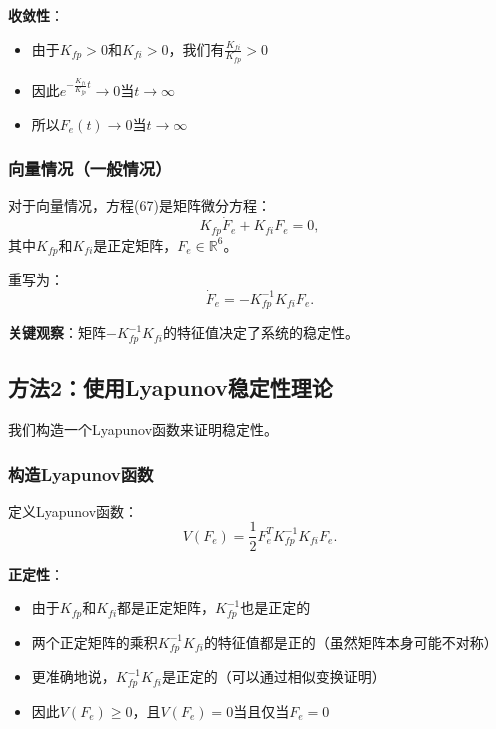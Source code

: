 \documentclass{article}
\begin{document}
\textbf{收敛性}：
\begin{itemize}
\item 由于$K_{fp} > 0$和$K_{fi} > 0$，我们有$\frac{K_{fi}}{K_{fp}} > 0$
\item 因此$e^{-\frac{K_{fi}}{K_{fp}}t} \to 0$当$t \to \infty$
\item 所以$F_e(t) \to 0$当$t \to \infty$
\end{itemize}

\subsubsection{向量情况（一般情况）}

对于向量情况，方程(67)是矩阵微分方程：
\begin{equation}
K_{fp}\dot{F}_e + K_{fi}F_e = 0,
\end{equation}
其中$K_{fp}$和$K_{fi}$是正定矩阵，$F_e \in \mathbb{R}^6$。

重写为：
\begin{equation}
\dot{F}_e = -K_{fp}^{-1}K_{fi}F_e. \tag{67'}
\end{equation}

\textbf{关键观察}：矩阵$-K_{fp}^{-1}K_{fi}$的特征值决定了系统的稳定性。

\subsection{方法2：使用Lyapunov稳定性理论}

我们构造一个Lyapunov函数来证明稳定性。

\subsubsection{构造Lyapunov函数}

定义Lyapunov函数：
\begin{equation}
V(F_e) = \frac{1}{2}F_e^T K_{fp}^{-1}K_{fi}F_e.
\end{equation}

\textbf{正定性}：
\begin{itemize}
\item 由于$K_{fp}$和$K_{fi}$都是正定矩阵，$K_{fp}^{-1}$也是正定的
\item 两个正定矩阵的乘积$K_{fp}^{-1}K_{fi}$的特征值都是正的（虽然矩阵本身可能不对称）
\item 更准确地说，$K_{fp}^{-1}K_{fi}$是正定的（可以通过相似变换证明）
\item 因此$V(F_e) \geq 0$，且$V(F_e) = 0$当且仅当$F_e = 0$
\end{itemize}
\end{document}
